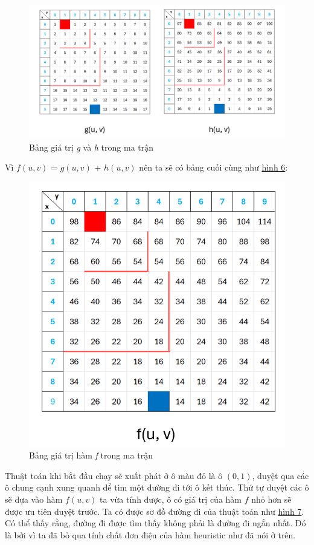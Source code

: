 \begin{figure}[H]
    \centering
    \includegraphics[width=1\linewidth]{img/astar_pic2.png}
    \caption{Bảng giá trị \textit{g} và \textit{h} trong ma trận}
    \label{fig:astar_pic2}
\end{figure}

Vì $f(u, v)$ = $g(u, v)$ + $h(u, v)$ nên ta sẽ có bảng cuối cùng như \hyperref[fig:astar_pic3]{hình 6}:

\begin{figure}[H]
    \centering
    \includegraphics[width=0.5\linewidth]{img/astar_pic3.png}
    \caption{Bảng giá trị hàm \textit{f} trong ma trận}
    \label{fig:astar_pic3}
\end{figure}

Thuật toán khi bắt đầu chạy sẽ xuất phát ở ô màu đỏ là ô $(0, 1)$, duyệt qua các ô chung cạnh xung quanh để tìm một đường đi tới ô kết thúc. Thứ tự duyệt các ô sẽ dựa vào hàm $f(u, v)$ ta vừa tính được, ô có giá trị của hàm $f$ nhỏ hơn sẽ được ưu tiên duyệt trước. Ta có được sơ đồ đường đi của thuật toán như \hyperref[fig:astar_pic4]{hình 7}. Có thể thấy rằng, đường đi được tìm thấy không phải là đường đi ngắn nhất. Đó là bởi vì ta đã bỏ qua tính chất đơn điệu của hàm heuristic như đã nói ở trên.

